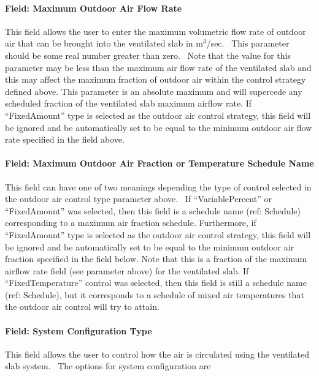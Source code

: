 \paragraph{Field: Maximum Outdoor Air Flow Rate}\label{field-maximum-outdoor-air-flow-rate-001}

This field allows the user to enter the maximum volumetric flow rate of outdoor air that can be brought into the ventilated slab in m\(^{3}\)/sec.~ This parameter should be some real number greater than zero.~ Note that the value for this parameter may be less than the maximum air flow rate of the ventilated slab and this may affect the maximum fraction of outdoor air within the control strategy defined above. This parameter is an absolute maximum and will supercede any scheduled fraction of the ventilated slab maximum airflow rate. If ``FixedAmount'' type is selected as the outdoor air control strategy, this field will be ignored and be automatically set to be equal to the minimum outdoor air flow rate specified in the field above.

\paragraph{Field: Maximum Outdoor Air Fraction or Temperature Schedule Name}\label{field-maximum-outdoor-air-fraction-or-temperature-schedule-name}

This field can have one of two meanings depending the type of control selected in the outdoor air control type parameter above.~ If ``VariablePercent'' or ``FixedAmount'' was selected, then this field is a schedule name (ref: Schedule) corresponding to a maximum air fraction schedule. Furthermore, if ``FixedAmount'' type is selected as the outdoor air control strategy, this field will be ignored and be automatically set to be equal to the minimum outdoor air fraction specified in the field below. Note that this is a fraction of the maximum airflow rate field (see parameter above) for the ventilated slab. If ``FixedTemperature'' control was selected, then this field is still a schedule name (ref: Schedule), but it corresponds to a schedule of mixed air temperatures that the outdoor air control will try to attain.

\paragraph{Field: System Configuration Type}\label{field-system-configuration-type}

This field allows the user to control how the air is circulated using the ventilated slab system.~ The options for system configuration are

